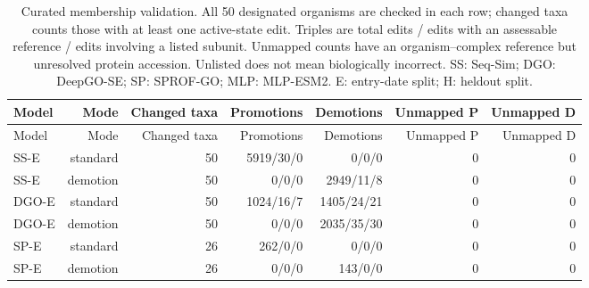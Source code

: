 \begingroup\scriptsize
\setlength{\tabcolsep}{4pt}
\begin{longtable}{lrrrrrr}
\caption{Curated membership validation. All 50 designated organisms are checked in each row; changed taxa counts those with at least one active-state edit. Triples are total edits / edits with an assessable reference / edits involving a listed subunit. Unmapped counts have an organism--complex reference but unresolved protein accession. Unlisted does not mean biologically incorrect. SS: Seq-Sim; DGO: DeepGO-SE; SP: SPROF-GO; MLP: MLP-ESM2. E: entry-date split; H: heldout split.}\label{tab:supp-membership}\\
\toprule
Model & Mode & Changed taxa & Promotions & Demotions & Unmapped P & Unmapped D \\
\midrule
\endfirsthead
\toprule
Model & Mode & Changed taxa & Promotions & Demotions & Unmapped P & Unmapped D \\
\midrule
\endhead
SS-E & standard & 50 & 5919/30/0 & 0/0/0 & 0 & 0 \\
SS-E & demotion & 50 & 0/0/0 & 2949/11/8 & 0 & 0 \\
DGO-E & standard & 50 & 1024/16/7 & 1405/24/21 & 0 & 0 \\
DGO-E & demotion & 50 & 0/0/0 & 2035/35/30 & 0 & 0 \\
SP-E & standard & 26 & 262/0/0 & 0/0/0 & 0 & 0 \\
SP-E & demotion & 26 & 0/0/0 & 143/0/0 & 0 & 0 \\
\bottomrule
\end{longtable}
\endgroup
